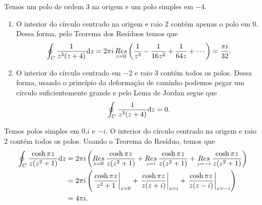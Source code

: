 \begin{questions}
\begin{solution}
    Temos um polo de ordem 3 na origem e um polo simples em $-4$.
    \begin{enumerate}[label=(\alph*)]
        \item O interior do círculo centrado na origem e raio $2$ contém apenas o polo em $0$. Dessa forma, pelo Teorema dos Resíduos temos que
        \begin{align*}
            \oint_C \frac{1}{z^3(z+4)} \mathrm{d} z
                = 2\pi i \mathop{Res}\limits_{z=0} \left( \frac{1}{z^3} - \frac{1}{16z^2} + \frac{1}{64z} + \cdots \right)
                = \frac{\pi i}{32}.
        \end{align*}
        \item O interior do círculo centrado em $-2$ e raio $3$ contém todos os polos. Dessa forma, usando o princípio da deformação de caminho podemos pegar um círculo suficientemente grande e pelo Lema de Jordan segue que
        \begin{align*}
            \oint_C \frac{1}{z^3(z+4)} \mathrm{d} z = 0.
        \end{align*}
    \end{enumerate}
\end{solution}

\begin{solution}
    Temos polos simples em $0$,$i$ e $-i$. O interior do círculo centrado na origem e raio $2$ contém todos os polos. Usando o Teorema do Resíduo, temos que
    \begin{align*}
        \oint_C \frac{\cosh \pi z}{z(z^2 + 1)} \mathrm{d} z
            &= 2\pi i \left(\mathop{Res}\limits_{z=0} \frac{\cosh \pi z}{z(z^2 + 1)} + \mathop{Res}\limits_{z=i} \frac{\cosh \pi z}{z(z^2 + 1)} + \mathop{Res}\limits_{z=-i} \frac{\cosh \pi z}{z(z^2 + 1)} \right) \\
            &= 2\pi i \left(\left.\frac{\cosh \pi z}{z^2 + 1}\right|_{z=0} + \left.\frac{\cosh \pi z}{z(z + i)}\right|_{z=i} + \left.\frac{\cosh \pi z}{z(z - i)}\right|_{z=-i} \right) \\
            &= 4 \pi i.
    \end{align*}
\end{solution}


\end{questions}
